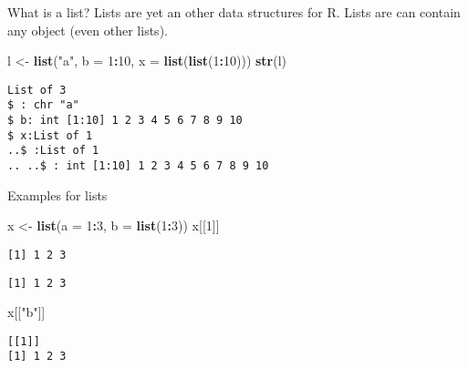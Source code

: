 \documentclass[ignorenonframetext,,t]{beamer}
\let\oldtextbf\textbf
\renewcommand{\textbf}[1]{\textcolor{spamwell}{\oldtextbf{#1}}}
\newenvironment{Shaded}{\begin{snugshade}}{\end{snugshade}}
\newcommand{\AttributeTok}[1]{\textcolor[rgb]{0.13,0.29,0.53}{#1}}
\newcommand{\DecValTok}[1]{\textcolor[rgb]{0.00,0.00,0.81}{#1}}
\newcommand{\FunctionTok}[1]{\textcolor[rgb]{0.13,0.29,0.53}{\textbf{#1}}}
\newcommand{\NormalTok}[1]{#1}
\newcommand{\OtherTok}[1]{\textcolor[rgb]{0.56,0.35,0.01}{#1}}
\newcommand{\SpecialCharTok}[1]{\textcolor[rgb]{0.81,0.36,0.00}{\textbf{#1}}}
\newcommand{\StringTok}[1]{\textcolor[rgb]{0.31,0.60,0.02}{#1}}
\begin{document}
\begin{frame}[fragile]
\begin{block}{What is a list?}
\protect\hypertarget{what-is-a-list}{}
Lists are yet an other data structures for R. Lists are can contain any
object (even other lists).

\begin{Shaded}
\begin{Highlighting}[]
\NormalTok{l }\OtherTok{\textless{}{-}} \FunctionTok{list}\NormalTok{(}\StringTok{"a"}\NormalTok{, }\AttributeTok{b =} \DecValTok{1}\SpecialCharTok{:}\DecValTok{10}\NormalTok{, }\AttributeTok{x =} \FunctionTok{list}\NormalTok{(}\FunctionTok{list}\NormalTok{(}\DecValTok{1}\SpecialCharTok{:}\DecValTok{10}\NormalTok{)))}
\FunctionTok{str}\NormalTok{(l)}
\end{Highlighting}
\end{Shaded}

\begin{verbatim}
List of 3
$ : chr "a"
$ b: int [1:10] 1 2 3 4 5 6 7 8 9 10
$ x:List of 1
..$ :List of 1
.. ..$ : int [1:10] 1 2 3 4 5 6 7 8 9 10
\end{verbatim}
\end{block}
\end{frame}

\begin{frame}[fragile]
\begin{block}{Examples for lists}
\protect\hypertarget{examples-for-lists}{}
\begin{Shaded}
\begin{Highlighting}[]
\NormalTok{x }\OtherTok{\textless{}{-}} \FunctionTok{list}\NormalTok{(}\AttributeTok{a =} \DecValTok{1}\SpecialCharTok{:}\DecValTok{3}\NormalTok{, }\AttributeTok{b =} \FunctionTok{list}\NormalTok{(}\DecValTok{1}\SpecialCharTok{:}\DecValTok{3}\NormalTok{))}
\NormalTok{x[[}\DecValTok{1}\NormalTok{]]}
\end{Highlighting}
\end{Shaded}

\begin{verbatim}
[1] 1 2 3
\end{verbatim}

\begin{Shaded}
\end{Shaded}

\begin{verbatim}
[1] 1 2 3
\end{verbatim}

\begin{Shaded}
\begin{Highlighting}[]
\NormalTok{x[[}\StringTok{"b"}\NormalTok{]]}
\end{Highlighting}
\end{Shaded}

\begin{verbatim}
[[1]]
[1] 1 2 3
\end{verbatim}
\end{block}
\end{frame}
\end{document}
